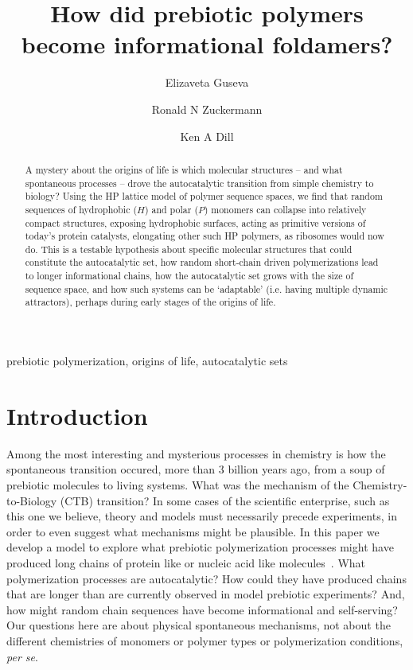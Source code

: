 \documentclass[5p,times]{elsarticle}
\begin{document}
\begin{frontmatter}
\title{How did prebiotic polymers become informational foldamers?}
\author[addr1]{Elizaveta Guseva}
\author[addr2]{Ronald N Zuckermann}
\author[addr1]{Ken A Dill}
\address[addr1]{Laufer Center for Physical and Quantitative Biology, and Departments of Physics \& 
Astronomy and Chemistry, Stony Brook University, Stony Brook, NY, (United States)}
\address[addr2]{Lawrence Berkeley National Laboratory (LBNL), Berkeley, CA (United States)}
% 
\begin{abstract}
A mystery about the origins of life is which molecular structures -- and what spontaneous 
processes -- drove the autocatalytic transition from simple chemistry to biology?  Using the HP 
lattice model of polymer sequence spaces, we find that random sequences of hydrophobic ($H$) and 
polar ($P$) monomers can collapse into relatively compact structures, exposing hydrophobic 
surfaces, acting as primitive versions of today's protein catalysts, elongating other such HP 
polymers, as ribosomes would now do.  This is a testable hypothesis about specific molecular 
structures that could constitute the autocatalytic set, how random short-chain driven 
polymerizations lead to longer informational chains, how the autocatalytic set grows with the size 
of sequence space, and how such systems can be `adaptable' (i.e. having multiple dynamic 
attractors), perhaps during early stages of the origins of life.
\end{abstract}
% 
\begin{keyword}
prebiotic polymerization, origins of life, autocatalytic sets
\end{keyword}
 \end{frontmatter}
\section{Introduction} 

 Among the most interesting and mysterious processes in chemistry is how the spontaneous transition 
occured, more than 3 billion years ago, from a soup of prebiotic molecules to living systems.  What 
was the mechanism of the Chemistry-to-Biology (CTB) transition?  In some cases of the scientific 
enterprise, such as this one we believe, theory and models must necessarily precede experiments, in 
order to even suggest what mechanisms might be plausible.  In this paper we develop a model to 
explore what prebiotic polymerization processes might have produced long chains of protein like or 
nucleic acid like molecules~\cite{Joyce1987,Abel2005}.  What polymerization processes are 
autocatalytic?  How could they have produced chains that are longer than are currently observed in 
model prebiotic experiments?  And, how might random chain sequences have become informational and 
self-serving?  Our questions here are about physical spontaneous mechanisms, not about the 
different chemistries of monomers or polymer types or polymerization conditions, \emph{per se}.  
 
\end{document}
